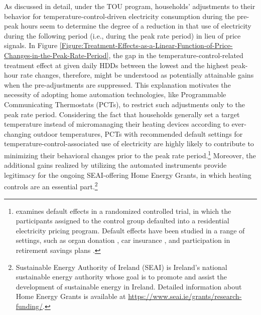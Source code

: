 As discussed in detail, under the TOU program, households' adjustments to their behavior for temperature-control-driven electricity consumption during the pre-peak hours seem to determine the degree of a reduction in that use of electricity during the following period (i.e., during the peak rate period) in lieu of price signals. In Figure \ref{Figure:Treatment-Effects-as-a-Linear-Function-of-Price-Changes-in-the-Peak-Rate-Period}, the gap in the temperature-control-related treatment effect at given daily HDDs between the lowest and the highest peak-hour rate changes, therefore, might be understood as potentially attainable gains when the pre-adjustments are suppressed. This explanation motivates the necessity of adopting home automation technologies, like Programmable Communicating Thermostats (PCTs), to restrict such adjustments only to the peak rate period. Considering the fact that households generally set a target temperature instead of micromanaging their heating devices according to ever-changing outdoor temperatures, PCTs with recommended default settings for temperature-control-associated use of electricity are highly likely to contribute to minimizing their behavioral changes prior to the peak rate period.\footnote{\cite{Default-Effects-and-Follow-on-Behavior_Evidence-from-an-Electricity-Pricing-Program_Fowlie-et-al_2021} examines default effects in a randomized controlled trial, in which the participants assigned to the control group defaulted into a residential electricity pricing program. Default effects have been studied in a range of settings, such as organ donation \citep{Medicine_Do-Defaults-Save-Lives_Johnson-and-Goldstein_2003, The-Impact-of-Presumed-Consent-Legislation-on-Cadaveric-Organ-Donoation_Abadie-and-Gay_2006}, car insurance \citep{Framing-Probability-Distortions-and-Insurance-Decisions_Johnson-et-al_1993}, and participation in retirement savings plans \citep{Status-Quo-Bias-in-Decision-Making_Samuelson-and-Zeckhauser_1988, The-Power-of-Suggestion_Madrian-and-Shea_2001, For-Better-or-For-Worse_Choi-et-al_2019}.} Moreover, the additional gains realized by utilizing the automated instruments provide legitimacy for the ongoing SEAI-offering Home Energy Grants, in which heating controls are an essential part.\footnote{Sustainable Energy Authority of Ireland (SEAI) is Ireland's national sustainable energy authority whose goal is to promote and assist the development of sustainable energy in Ireland. Detailed information about Home Energy Grants is available at \url{https://www.seai.ie/grants/research-funding/}.} 